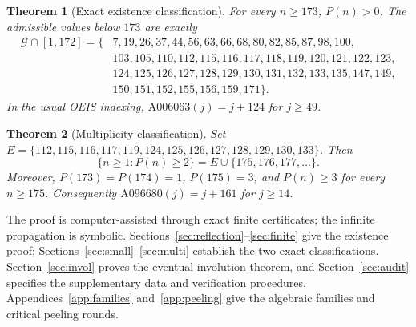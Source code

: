 \documentclass[9pt]{extarticle}
\newtheorem{theorem}{Theorem}[section]
\newcommand{\G}{\mathcal G}
\begin{document}
\begin{theorem}[Exact existence classification]\label{thm:membership}
For every $n\ge173$, $P(n)>0$. The admissible values below $173$ are exactly
\begin{equation}\label{eq:small}
\begin{split}
\G\cap[1,172]=\{&7,19,26,37,44,56,63,66,68,80,82,85,87,98,100,\\
&103,105,110,112,115,116,117,118,119,120,121,122,123,\\
&124,125,126,127,128,129,130,131,132,133,135,147,149,\\
&150,151,152,155,156,159,171\}.
\end{split}
\end{equation}
In the usual OEIS indexing, $\mathrm{A006063}(j)=j+124$ for $j\ge49$.
\end{theorem}
\begin{theorem}[Multiplicity classification]\label{thm:multi}
Set $E=\{112,115,116,117,119,124,125,126,127,128,129,130,133\}$. Then
\[
\{n\ge1:P(n)\ge2\}=E\cup\{175,176,177,\dots\}.
\]
Moreover, $P(173)=P(174)=1$, $P(175)=3$, and $P(n)\ge3$ for every $n\ge175$. Consequently $\mathrm{A096680}(j)=j+161$ for $j\ge14$.
\end{theorem}

The proof is computer-assisted through exact finite certificates; the infinite propagation is symbolic. Sections~\ref{sec:reflection}--\ref{sec:finite} give the existence proof; Sections~\ref{sec:small}--\ref{sec:multi} establish the two exact classifications. Section~\ref{sec:invol} proves the eventual involution theorem, and Section~\ref{sec:audit} specifies the supplementary data and verification procedures. Appendices~\ref{app:families} and~\ref{app:peeling} give the algebraic families and critical peeling rounds.
\end{document}
